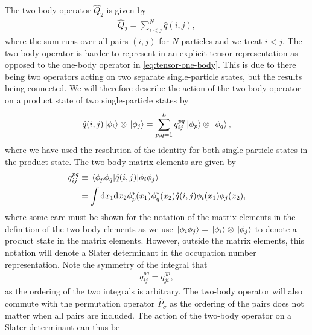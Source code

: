         The two-body operator $\hat{Q}_2$ is given by
        \begin{align}
            \hat{Q}_2
            = \sum_{i < j}^{N}
            \hat{q}(i, j),
        \end{align}
        where the sum runs over all pairs $(i, j)$ for $N$ particles and we
        treat $i < j$.
        The two-body operator is harder to represent in an explicit tensor
        representation as opposed to the one-body operator in
        \autoref{eq:tensor-one-body}.
        This is due to there being two operators acting on two separate
        single-particle states, but the results being connected.
        We will therefore describe the action of the two-body operator on a
        product state of two single-particle states by
        \begin{align}
            \hat{q}(i, j)\ket*{\phi_i}\otimes\ket*{\phi_j}
            = \sum_{p, q = 1}^{L}
            q^{pq}_{ij}
            \ket*{\phi_p}\otimes\ket*{\phi_q},
        \end{align}
        where we have used the resolution of the identity for both single-particle
        states in the product state.
        The two-body matrix elements are given by
        \begin{align}
            q^{pq}_{ij}
            &\equiv
            \mel*{\phi_p\phi_q}{\hat{q}(i, j)}{\phi_i\phi_j}
            \\
            &=
            \int\dd x_1 \dd x_2
            \phi^{*}_{p}(x_1)\phi^{*}_{q}(x_2)
            \hat{q}(i, j)
            \phi_i(x_1)\phi_j(x_2),
        \end{align}
        where some care must be shown for the notation of the matrix elements in
        the definition of the two-body elements as we use $\ket*{\phi_i\phi_j} =
        \ket*{\phi_i}\otimes\ket*{\phi_j}$ to denote a product state in the matrix
        elements.
        However, outside the matrix elements, this notation will denote a Slater
        determinant in the occupation number representation.
        Note the symmetry of the integral that
        \begin{align}
            q^{pq}_{ij} = q^{qp}_{ji},
            \label{eq:symmetry-two-body}
        \end{align}
        as the ordering of the two integrals is arbitrary.
        The two-body operator will also commute with the permutation operator
        $\hat{P}_{\sigma}$ as the ordering of the pairs does not matter when all
        pairs are included.
        The action of the two-body operator on a Slater determinant can thus be

